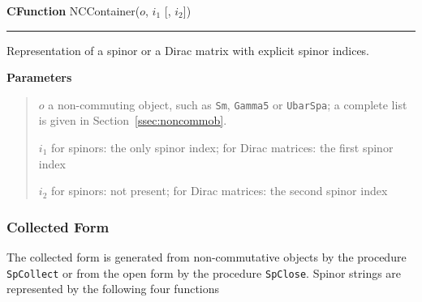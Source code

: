 \documentclass[preprint,number,12pt,sort&compress]{elsarticle}
\newlength{\funcindent}
\newlength{\funcwidth}
\newenvironment{Ventry}[1]%
 {\begin{list}{}{%
   \renewcommand{\makelabel}[1]{\texttt{##1:}\hfil}%
   \settowidth{\labelwidth}{\texttt{#1:}}%
   \setlength{\leftmargin}{\labelsep}%
   \addtolength{\leftmargin}{\labelwidth}}}%
 {\end{list}}
\newenvironment{CFunction}[2]{%
\hspace{.8\funcindent}\begin{boxedminipage}{\funcwidth}
	\raggedright \textbf{CFunction} #1(#2)

	\vspace{-1.5ex}

	\rule{\textwidth}{0.5\fboxrule}
	\setlength{\parskip}{2ex}
}{\end{boxedminipage}}
\newenvironment{Parameters}{%
	\setlength{\parskip}{1ex}
	\textbf{Parameters}
	\vspace{-1ex}
	\begin{quote}}{%
	\end{quote}}
\newenvironment{Also}{%
	\setlength{\parskip}{1ex}
	\textbf{See also}
	\vspace{-1ex}
	\begin{quote}}{%
	\end{quote}}
\begin{document}
\medskip
\begin{CFunction}{NCContainer}{$o$, $i_1$ [, $i_2$]}
	Representation of a spinor or a Dirac matrix with explicit
	spinor indices.

	\begin{Parameters}
		\begin{Ventry}{$i_1$}
			\item[$o$] a non-commuting object, such as \texttt{Sm},
				\texttt{Gamma5} or \texttt{UbarSpa}; a complete list
				is given in Section~\ref{ssec:noncommob}.
			\item[$i_1$] for spinors: the only spinor index;
			   for Dirac matrices: the first spinor index
			\item[$i_2$] for spinors: not present;
			   for Dirac matrices: the second spinor index
		\end{Ventry}
	\end{Parameters}
\end{CFunction}

\subsubsection{Collected Form}
The collected form is generated from non-commutative objects
by the procedure \texttt{SpCollect} or from the open form by
the procedure \texttt{SpClose}. Spinor strings are represented by
the following four functions
\end{document}
